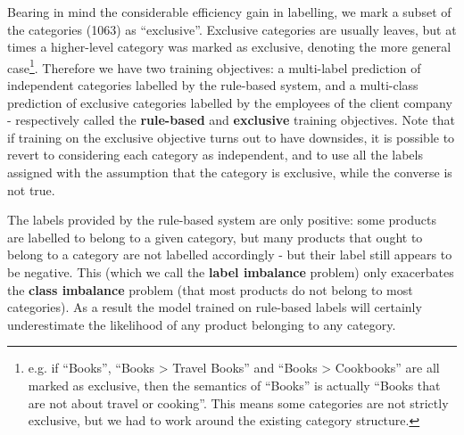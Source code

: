 Bearing in mind the considerable efficiency gain in labelling, we mark a subset of the categories (1063) as ``exclusive''.
Exclusive categories are usually leaves, but at times a higher-level category was marked as exclusive, denoting the more general case\footnote{e.g. if ``Books'', ``Books > Travel Books'' and ``Books > Cookbooks'' are all marked as exclusive, then the semantics of ``Books'' is actually ``Books that are not about travel or cooking''. This means some categories are not strictly exclusive, but we had to work around the existing category structure.}.
Therefore we have two training objectives: a multi-label prediction of independent categories labelled by the rule-based system, and a multi-class prediction of exclusive categories labelled by the employees of the client company - respectively called the \textbf{rule-based} and \textbf{exclusive} training objectives.
Note that if training on the exclusive objective turns out to have downsides, it is possible to revert to considering each category as independent, and to use all the labels assigned with the assumption that the category is exclusive, while the converse is not true.

\label{label_imbalance}

The labels provided by the rule-based system are only positive:  some products are labelled to belong to a given category, but many products that ought to belong to a category are not labelled  accordingly -  but their label still appears to be negative.
This (which we call the \textbf{label imbalance} problem) only exacerbates the \textbf{class imbalance} problem (that most products do not belong to most categories).
As a result the model trained on rule-based labels will certainly underestimate the likelihood of any product belonging to any category.

